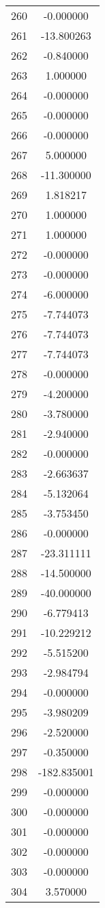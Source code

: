 \documentclass[12pt]{article}
\begin{document}
\begin{longtable}{@{}cc@{}}
260 & -0.000000 \\
261 & -13.800263 \\
262 & -0.840000 \\
263 & 1.000000 \\
264 & -0.000000 \\
265 & -0.000000 \\
266 & -0.000000 \\
267 & 5.000000 \\
268 & -11.300000 \\
269 & 1.818217 \\
270 & 1.000000 \\
271 & 1.000000 \\
272 & -0.000000 \\
273 & -0.000000 \\
274 & -6.000000 \\
275 & -7.744073 \\
276 & -7.744073 \\
277 & -7.744073 \\
278 & -0.000000 \\
279 & -4.200000 \\
280 & -3.780000 \\
281 & -2.940000 \\
282 & -0.000000 \\
283 & -2.663637 \\
284 & -5.132064 \\
285 & -3.753450 \\
286 & -0.000000 \\
287 & -23.311111 \\
288 & -14.500000 \\
289 & -40.000000 \\
290 & -6.779413 \\
291 & -10.229212 \\
292 & -5.515200 \\
293 & -2.984794 \\
294 & -0.000000 \\
295 & -3.980209 \\
296 & -2.520000 \\
297 & -0.350000 \\
298 & -182.835001 \\
299 & -0.000000 \\
300 & -0.000000 \\
301 & -0.000000 \\
302 & -0.000000 \\
303 & -0.000000 \\
304 & 3.570000 \\

\end{longtable}
\end{document}
